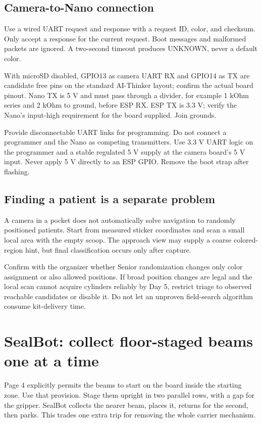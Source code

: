 \documentclass[10pt,a4paper]{article}
\begin{document}
\subsection{Camera-to-Nano connection}
Use a wired UART request and response with a request ID, color, and checksum. Only accept a response for the current request. Boot messages and malformed packets are ignored. A two-second timeout produces UNKNOWN, never a default color.

With microSD disabled, GPIO13 as camera UART RX and GPIO14 as TX are candidate free pins on the standard AI-Thinker layout; confirm the actual board pinout. Nano TX is 5 V and must pass through a divider, for example 1 kOhm series and 2 kOhm to ground, before ESP RX. ESP TX is 3.3 V; verify the Nano's input-high requirement for the board supplied. Join grounds.

Provide disconnectable UART links for programming. Do not connect a programmer and the Nano as competing transmitters. Use 3.3 V UART logic on the programmer and a stable regulated 5 V supply at the camera board's 5 V input. Never apply 5 V directly to an ESP GPIO. Remove the boot strap after flashing.

\subsection{Finding a patient is a separate problem}
A camera in a pocket does not automatically solve navigation to randomly positioned patients. Start from measured sticker coordinates and scan a small local area with the empty scoop. The approach view may supply a coarse colored-region hint, but final classification occurs only after capture.

Confirm with the organizer whether Senior randomization changes only color assignment or also allowed positions. If broad position changes are legal and the local scan cannot acquire cylinders reliably by Day 5, restrict triage to observed reachable candidates or disable it. Do not let an unproven field-search algorithm consume kit-delivery time.

\section{SealBot: collect floor-staged beams one at a time}
Page 4 explicitly permits the beams to start on the board inside the starting zone. Use that provision. Stage them upright in two parallel rows, with a gap for the gripper. SealBot collects the nearer beam, places it, returns for the second, then parks. This trades one extra trip for removing the whole carrier mechanism.
\end{document}
